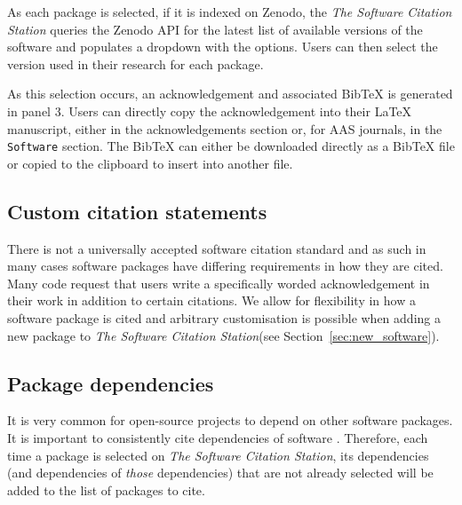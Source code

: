 \documentclass[twocolumn,linenumbers]{aastex631}
\newcommand{\site}{\textit{The Software Citation Station}\xspace}
\begin{document}
As each package is selected, if it is indexed on Zenodo, the \site queries the Zenodo API for the latest list of available versions of the software and populates a dropdown with the options. Users can then select the version used in their research for each package.

As this selection occurs, an acknowledgement  and associated BibTeX is generated in panel 3. Users can directly copy the acknowledgement into their \LaTeX{} manuscript, either in the acknowledgements section or, for AAS journals, in the \texttt{Software} section. The BibTeX can either be downloaded directly as a BibTeX file or copied to the clipboard to insert into another file.

\subsection{Custom citation statements}\label{sec:custom}
There is not a universally accepted software citation standard and as such in many cases software packages have differing requirements in how they are cited. Many code request that users write a specifically worded acknowledgement in their work in addition to certain citations. We allow for flexibility in how a software package is cited and arbitrary customisation is possible when adding a new package to \site (see Section~\ref{sec:new_software}).

\subsection{Package dependencies}\label{sec:deps}
It is very common for open-source projects to depend on other software packages. It is important to consistently cite dependencies of software \citep{sochat2022citelang}. Therefore, each time a package is selected on \site, its dependencies (and dependencies of \textit{those} dependencies) that are not already selected will be added to the list of packages to cite.
\end{document}
